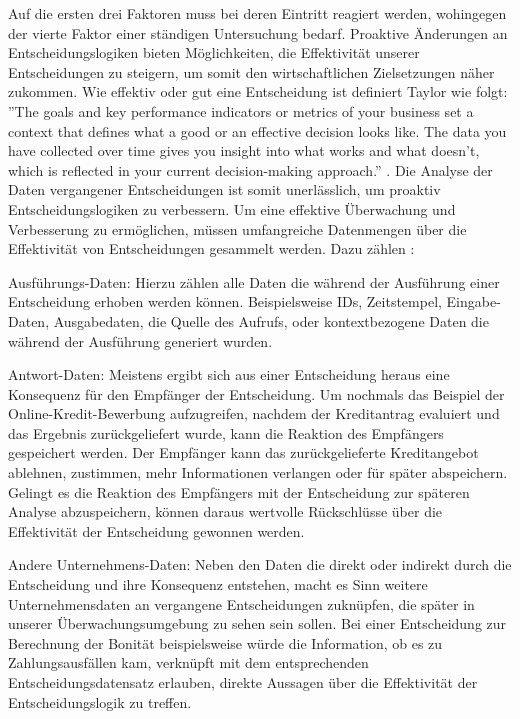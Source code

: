 Auf die ersten drei Faktoren muss bei deren Eintritt reagiert werden, wohingegen der vierte Faktor einer ständigen Untersuchung bedarf. Proaktive Änderungen an Entscheidungslogiken bieten Möglichkeiten, die Effektivität unserer Entscheidungen zu steigern, um somit den wirtschaftlichen Zielsetzungen näher zukommen. Wie effektiv oder gut eine Entscheidung ist definiert Taylor wie folgt: ''The goals and key performance indicators or metrics of your business set a context that defines what a good or an effective decision looks like. The data you have collected over time gives you insight into what works and what doesn't, which is reflected in your current decision-making approach.'' \cite[vgl. S. 159]{JT11}. Die Analyse der Daten vergangener Entscheidungen ist somit unerlässlich, um proaktiv Entscheidungslogiken zu verbessern. Um eine effektive Überwachung und Verbesserung zu ermöglichen, müssen umfangreiche Datenmengen über die Effektivität von Entscheidungen gesammelt werden. Dazu zählen \cite[vgl. S. 164]{JT11}:

\begin{itemize*}
\item Ausführungs-Daten: Hierzu zählen alle Daten die während der Ausführung einer Entscheidung erhoben werden können. Beispielsweise IDs, Zeitstempel, Eingabe-Daten, Ausgabedaten, die Quelle des Aufrufs, oder kontextbezogene Daten die während der Ausführung generiert wurden.   
\item Antwort-Daten: Meistens ergibt sich aus einer Entscheidung heraus eine Konsequenz für den Empfänger der Entscheidung. Um nochmals das Beispiel der Online-Kredit-Bewerbung aufzugreifen, nachdem der Kreditantrag evaluiert und das Ergebnis zurückgeliefert wurde, kann die Reaktion des Empfängers gespeichert werden. Der Empfänger kann das zurückgelieferte Kreditangebot ablehnen, zustimmen, mehr Informationen verlangen oder für später abspeichern. Gelingt es die Reaktion des Empfängers mit der Entscheidung zur späteren Analyse abzuspeichern, können daraus wertvolle Rückschlüsse über die Effektivität der Entscheidung gewonnen werden.     
\item Andere Unternehmens-Daten: Neben den Daten die direkt oder indirekt durch die Entscheidung und ihre Konsequenz entstehen, macht es Sinn weitere Unternehmensdaten an vergangene Entscheidungen zuknüpfen, die später in unserer Überwachungsumgebung zu sehen sein sollen. Bei einer Entscheidung zur Berechnung der Bonität beispielsweise würde die Information, ob es zu Zahlungsausfällen kam, verknüpft mit dem entsprechenden Entscheidungsdatensatz erlauben, direkte Aussagen über die Effektivität der Entscheidungslogik zu treffen.       
\end{itemize*}         

